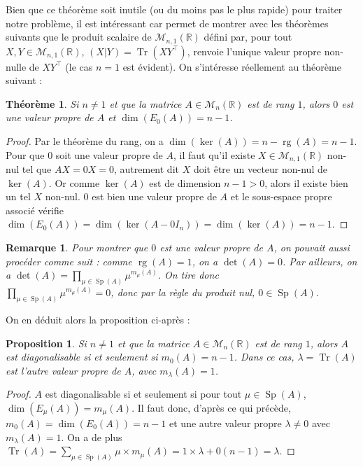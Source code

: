 \documentclass[a4paper]{article}
\newtheorem*{theorem}{Théorème}
\newtheorem*{remark}{Remarque}
\newtheorem*{proposition}{Proposition}
\begin{document}
Bien que ce théorème soit inutile (ou du moins pas le plus rapide) pour traiter notre problème, il est intéressant car permet de montrer avec les théorèmes suivants que le produit scalaire de $\mathcal{M}_{n, 1}(\mathbb{R})$ défini par, pour tout $X, Y \in \mathcal{M}_{n, 1}(\mathbb{R})$, $(X|Y) = \operatorname{Tr}\left(XY^\top\right)$, renvoie l'unique valeur propre non-nulle de $XY^\top$ (le cas $n=1$ est évident).
On s'intéresse réellement au théorème suivant :

\begin{theorem}
    Si $n \neq 1$ et que la matrice $A \in \mathcal{M}_{n}(\mathbb{R})$ est de rang $1$, alors $0$ est une valeur propre de $A$ et $\dim(E_0(A)) = n-1$.
\end{theorem}

\begin{proof}
    Par le théorème du rang, on a $\dim(\ker(A)) = n - \operatorname{rg}(A) = n-1$.
    Pour que $0$ soit une valeur propre de $A$, il faut qu'il existe $X \in \mathcal{M}_{n,1}(\mathbb{R})$ non-nul tel que $AX = 0X = 0$, autrement dit $X$ doit être un vecteur non-nul de $\ker(A)$. Or comme $\ker(A)$ est de dimension $n-1 > 0$, alors il existe bien un tel $X$ non-nul. $0$ est bien une valeur propre de $A$ et le sous-espace propre associé vérifie $\dim(E_0(A)) = \dim(\ker(A-0 I_n)) = \dim(\ker(A)) = n-1$.
\end{proof}

\begin{remark}
    Pour montrer que $0$ est une valeur propre de $A$, on pouvait aussi procéder comme suit : comme $\operatorname{rg}(A)=1$, on a $\det(A) = 0$. Par ailleurs, on a $\displaystyle \det(A) = \prod_{\mu \in \operatorname{Sp}(A)} \mu^{m_\mu(A)}$. On tire donc \\$\displaystyle \prod_{\mu \in \operatorname{Sp}(A)} \mu^{m_\mu(A)} = 0$, donc par la règle du produit nul, $0 \in \operatorname{Sp}(A)$.
\end{remark}

On en déduit alors la proposition ci-après :

\begin{proposition}
    Si $n \neq 1$ et que la matrice $A \in \mathcal{M}_{n}(\mathbb{R})$ est de rang $1$, alors $A$ est diagonalisable si et seulement si $m_0(A) = n-1$. Dans ce cas, $\lambda = \operatorname{Tr}(A)$ est l'autre valeur propre de $A$, avec $m_\lambda(A) = 1$.
\end{proposition}

\begin{proof}
    $A$ est diagonalisable si et seulement si pour tout $\mu \in \operatorname{Sp}(A)$, $\dim(E_\mu(A)) = m_\mu(A)$. Il faut donc, d'après ce qui précède, $m_0(A) = \dim(E_0(A)) = n-1$ et une autre valeur propre $\lambda \neq 0$ avec $m_\lambda(A) = 1$. On a de plus $\displaystyle \operatorname{Tr}(A) = \sum_{\mu \in \operatorname{Sp}(A)} \mu \times m_\mu(A) = 1\times \lambda + 0(n-1) = \lambda$.
\end{proof}
\end{document}
